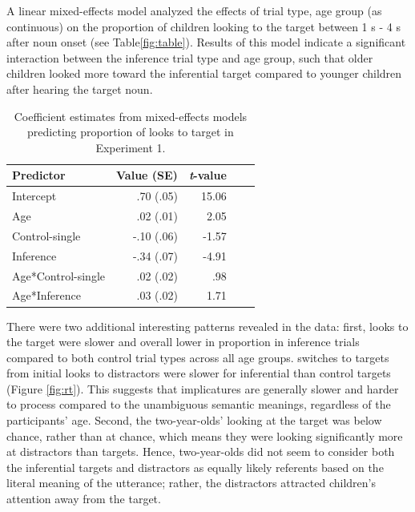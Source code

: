 \documentclass[10pt,letterpaper]{article}
\begin{document}
A linear mixed-effects model analyzed the effects of trial type, age group (as continuous) on the proportion of children looking to the target between 1 s - 4 s after noun onset (see Table\ref{fig:table}). Results of this model indicate a significant interaction between the inference trial type and age group, such that older children looked more toward the inferential target compared to younger children after hearing the target noun.

\begin{table}[!b]
\begin{center} 
\caption{Coefficient estimates from mixed-effects models predicting proportion of looks to target in Experiment 1.} 
\label{tab:table} 
\vskip 0.12in
\begin{tabular}{l r r r l} 
\hline
Predictor  &  Value (SE) & \emph{t}-value\\
\hline
Intercept  & .70 (.05) & 15.06 \\
Age & .02 (.01) &  2.05 \\
Control-single & -.10 (.06) & -1.57 \\
Inference & -.34 (.07) & -4.91 \\
Age*Control-single & .02 (.02) & .98 \\
Age*Inference & .03 (.02) & 1.71 \\
\hline
\end{tabular} 
\end{center} 
\end{table}

There were two additional interesting patterns revealed in the data: first, looks to the target were slower and overall lower in proportion in inference trials compared to both control trial types across all age groups. switches to targets from initial looks to distractors were slower for inferential than control targets (Figure \ref{fig:rt}). This suggests that implicatures are generally slower and harder to process compared to the unambiguous semantic meanings, regardless of the participants' age. Second, the two-year-olds' looking at the target was below chance, rather than at chance, which means they were looking significantly more at distractors than targets. Hence, two-year-olds did not seem to consider both the inferential targets and distractors as equally likely referents based on the literal meaning of the utterance; rather, the distractors attracted children's attention away from the target. 
\end{document}
